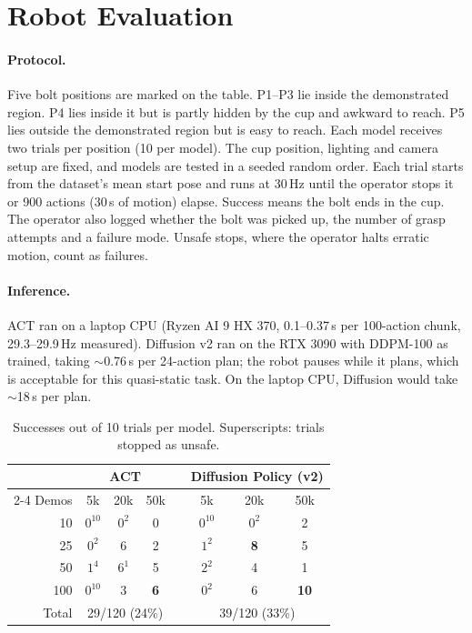 \documentclass[10pt,twocolumn,letterpaper]{article}
\newcommand{\best}[1]{\textbf{#1}}
\begin{document}
\section{Robot Evaluation}

\paragraph{Protocol.} Five bolt positions are marked on the table. P1--P3 lie inside the
demonstrated region. P4 lies inside it but is partly hidden by the cup and awkward to reach. P5
lies outside the demonstrated region but is easy to reach. Each model receives two trials per
position (10 per model). The cup position, lighting and camera setup are fixed, and models are
tested in a seeded random order. Each trial starts from the dataset's mean start pose and runs at
30\,Hz until the operator stops it or 900 actions (30\,s of motion) elapse. Success means the
bolt ends in the cup. The operator also logged whether the bolt was picked up, the number of
grasp attempts and a failure mode. Unsafe stops, where the operator halts erratic motion, count
as failures.

\paragraph{Inference.} ACT ran on a laptop CPU (Ryzen AI 9 HX 370, 0.1--0.37\,s per 100-action
chunk, 29.3--29.9\,Hz measured). Diffusion v2 ran on the RTX 3090 with DDPM-100 as trained,
taking $\sim$0.76\,s per 24-action plan; the robot pauses while it plans, which is acceptable for
this quasi-static task. On the laptop CPU, Diffusion would take $\sim$18\,s per plan.

\begin{table}[t]
  \centering\small
  \setlength{\tabcolsep}{4.5pt}
  \caption{Successes out of 10 trials per model. Superscripts: trials stopped as unsafe.}
  \label{tab:grid}
  \begin{tabular}{@{}r ccc c ccc@{}}
    \toprule
    & \multicolumn{3}{c}{ACT} && \multicolumn{3}{c}{Diffusion Policy (v2)} \\
    \cmidrule{2-4}\cmidrule{6-8}
    Demos & 5k & 20k & 50k && 5k & 20k & 50k \\
    \midrule
    10  & $0^{10}$ & $0^{2}$ & 0        && $0^{10}$ & $0^{2}$ & 2 \\
    25  & $0^{2}$  & 6       & 2        && $1^{2}$  & \best{8} & 5 \\
    50  & $1^{4}$  & $6^{1}$ & 5        && $2^{2}$  & 4       & 1 \\
    100 & $0^{10}$ & 3       & \best{6} && $0^{2}$  & 6       & \best{10} \\
    \midrule
    Total & \multicolumn{3}{c}{29/120 (24\%)} && \multicolumn{3}{c}{39/120 (33\%)} \\
    \bottomrule
  \end{tabular}
\end{table}
\end{document}

